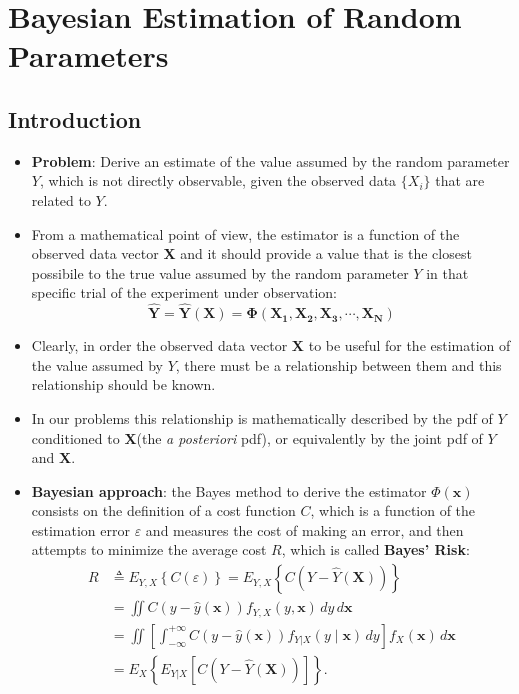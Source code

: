 \section{Bayesian Estimation of Random Parameters}
\subsection{Introduction}
\begin{itemize}
    \item \textbf{Problem}: Derive an estimate of the value assumed by the random parameter \(Y\), which is not directly observable, given the observed data \(\{X_i\}\) that are related to \(Y\).
    \item From a mathematical point of view, the estimator is a function of the observed data vector \textbf{X} and it should provide a value that is the closest possibile to the true value assumed by the random parameter \(Y\) in that specific trial of the experiment under observation:
    \[
    \boxed{\mathbf{\hat{Y}=\hat{Y}(X)=\Phi(X_1,X_2,X_3,\cdots,X_N)}}
    \]
    \item Clearly, in order the observed data vector \textbf{X} to be useful for the estimation of the value assumed by \(Y\), there must be a relationship between them and this relationship should be known.
    \item In our problems this relationship is mathematically described by the pdf of \(Y\) conditioned to \textbf{X}(the \textit{a posteriori} pdf), or equivalently by the joint pdf of \(Y\) and \textbf{X}.
    \item \textbf{Bayesian approach}: the Bayes method to derive the estimator \(\Phi(\mathbf{x})\) consists on the definition of a cost function \(C\), which is a function of the estimation error \(\varepsilon\) and measures the cost of making an error, and then attempts to minimize the average cost \(R\), which is called \textbf{Bayes' Risk}:
\begin{align*}
R &\triangleq E_{Y,X}\!\left\{ C(\varepsilon) \right\}
   = E_{Y,X}\!\left\{ C\!\left(Y-\hat{Y}(\mathbf{X})\right) \right\} \\[4pt]
  &= \iint C\!\left(y-\hat{y}(\mathbf{x})\right)
          f_{Y,X}(y,\mathbf{x}) \, dy \, d\mathbf{x} \\[4pt]
  &= \iint \left[ \int_{-\infty}^{+\infty}
          C\!\left(y-\hat{y}(\mathbf{x})\right)
          f_{Y|X}(y \mid \mathbf{x}) \, dy \right]
          f_{X}(\mathbf{x}) \, d\mathbf{x} \\[4pt]
  &= E_{X}\!\left\{ E_{Y|X}\!\left[
          C\!\left(Y-\hat{Y}(\mathbf{X})\right)
        \right] \right\}.
\end{align*}


\end{itemize}
